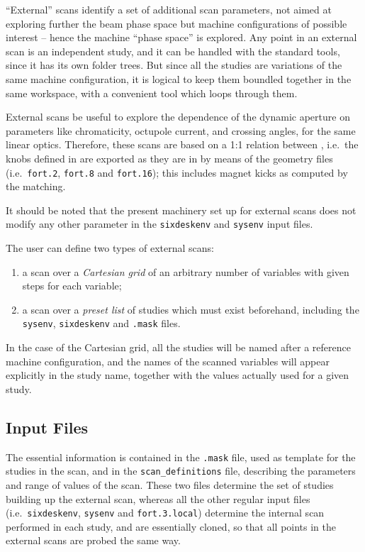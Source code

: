 ``External'' scans identify a set of additional scan parameters, not aimed at
exploring further the beam phase space but machine configurations of possible
interest -- hence the machine ``phase space'' is explored. Any point in
an external scan is an independent \SIXDESK{} study, and it can be handled
with the standard tools, since it has its own folder trees. But since
all the studies are variations of the same machine configuration, it is
logical to keep them boundled together in the same workspace, with a convenient
tool which loops through them.

External scans be useful to explore the dependence of the dynamic aperture
on parameters like chromaticity, octupole current, and crossing angles, 
for the same linear optics. Therefore,
these scans are based on a 1:1 relation between \MADX{}
\SIXTRACK{}, i.e.~the knobs defined in \MADX{} are exported as they
are in \SIXTRACK{} by means of the geometry files (i.e.~\texttt{fort.2},
\texttt{fort.8} and \texttt{fort.16}); this includes magnet kicks as
computed by the \MADX{} matching.

It should be noted that the present machinery set up for external scans
does not modify any other parameter in the \texttt{sixdeskenv} and
\texttt{sysenv} input files.

The user can define two types of external scans:
\begin{enumerate}
\item a scan over a \emph{Cartesian grid} of an arbitrary number
  of variables with given steps for each variable;
\item a scan over a \emph{preset list} of studies which must exist beforehand,
  including the \texttt{sysenv}, \texttt{sixdeskenv} and \texttt{.mask}
  files.
\end{enumerate}

In the case of the Cartesian grid, all the studies will be named after
a reference machine configuration, and the names of the scanned variables
will appear explicitly in the study name, together with the values actually
used for a given study.

\subsection{Input Files}
The essential information is contained in the \texttt{.mask}
file, used as template for the studies in the scan,
and in the \texttt{scan\_definitions} file,
describing the parameters and range of values
of the scan. These two files determine the set of studies building
up the external scan, whereas
all the other regular input files (i.e.~\texttt{sixdeskenv},
\texttt{sysenv} and \texttt{fort.3.local}) determine the
internal scan performed in each study, and are essentially cloned,
so that all points in the external scans are probed the same way.

